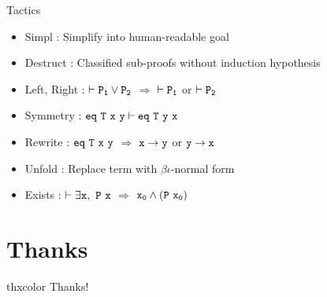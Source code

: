 \documentclass[UTF-8]{beamer}
\begin{document}
\begin{frame}{Tactics}
\begin{itemize}
\item Simpl : Simplify into human-readable goal 
\item Destruct : Classified sub-proofs without induction hypothesis
\item Left, Right : $\tt \vdash P_1\vee P_2$ $\Rightarrow$ $\tt \vdash P_1$ or $\tt\vdash P_2$ 
\item Symmetry : $\tt eq\ T\ x\ y\vdash eq\ T\ y\ x$
\item Rewrite : $\tt eq\ T\ x\ y$ $\Rightarrow$ $\tt x\to y$ or $\tt y\to x$
\item Unfold : Replace term with $\beta\iota$-normal form
\item Exists : $\tt \vdash\exists x,\ P\ x$ $\Rightarrow$ $\tt x_0\wedge(P\ x_0)$
\end{itemize}
\end{frame}

\section*{Thanks}
\begin{frame}
\LARGE
\begin{beamercolorbox}[center,ht=3em]{thxcolor}
\vspace{1em}
\Huge Thanks!
\end{beamercolorbox}
\end{frame}
\end{document}
